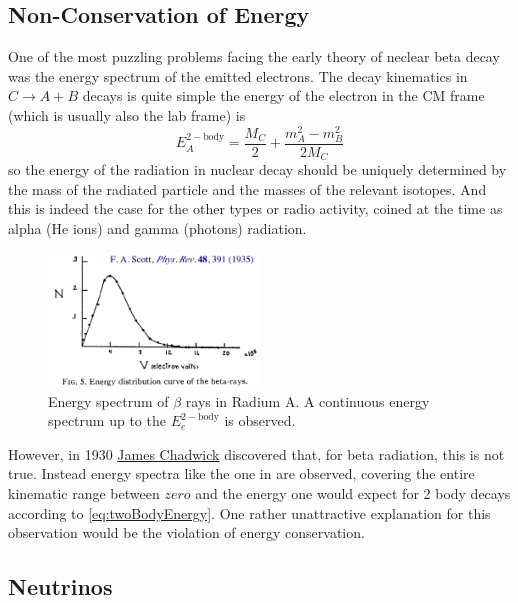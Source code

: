 \subsection{Non-Conservation of Energy}
 One of the most puzzling problems facing the early theory of neclear
 beta decay was the energy spectrum of the emitted electrons. The
 decay kinematics in $C\to A+B$ decays is quite simple the
 energy of the electron in the CM frame (which is usually also the lab
 frame) is
\begin{equation}
\label{eq:twoBodyEnergy}
E_A^{\mathrm{2-body}} = \frac{M_C}{2} + \frac{m_A^2 - m_B^2}{2M_C}
\end{equation}
 so the energy of the radiation in nuclear decay should be uniquely
 determined by the mass of the radiated particle and the masses of the
 relevant isotopes. And this is indeed the case for the other types or
 radio activity, coined at the time as alpha (He ions) and
 gamma (photons) radiation.
%
\begin{figure}
\includegraphics[width=0.5\textwidth]{fig/weak/betaspectrum.jpg}
\caption{Energy spectrum of $\beta$ rays in Radium A. A continuous energy
  spectrum up to the $E_e^{\mathrm{2-body}}$ is observed.
 \label{fig:betaEnergySpectrum}}
\end{figure}
 However, in 1930
 \href{http://www.nobel.se/physics/laureates/1935/chadwick-bio.html}{James
 Chadwick} discovered that, for beta radiation, this is not
 true. Instead energy spectra like the one in
  are observed, covering the entire
 kinematic range between $zero$ and the energy one would expect for 2
 body decays according to \eqref{eq:twoBodyEnergy}. One rather
 unattractive explanation for this observation would be the violation
 of energy conservation.

\subsection{Neutrinos}

